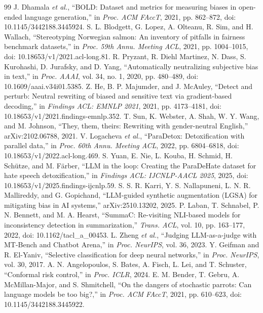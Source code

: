 \documentclass[12pt,a4paper,oneside]{report}
\begin{document}
\begin{thebibliography}{99}
 J. Dhamala \textit{et al.}, ``BOLD: Dataset and metrics for measuring biases in open-ended language generation,'' in \textit{Proc. ACM FAccT}, 2021, pp. 862--872, doi: 10.1145/3442188.3445924.
 S. L. Blodgett, G. Lopez, A. Olteanu, R. Sim, and H. Wallach, ``Stereotyping Norwegian salmon: An inventory of pitfalls in fairness benchmark datasets,'' in \textit{Proc. 59th Annu. Meeting ACL}, 2021, pp. 1004--1015, doi: 10.18653/v1/2021.acl-long.81.
 R. Pryzant, R. Diehl Martinez, N. Dass, S. Kurohashi, D. Jurafsky, and D. Yang, ``Automatically neutralizing subjective bias in text,'' in \textit{Proc. AAAI}, vol. 34, no. 1, 2020, pp. 480--489, doi: 10.1609/aaai.v34i01.5385.
 Z. He, B. P. Majumder, and J. McAuley, ``Detect and perturb: Neutral rewriting of biased and sensitive text via gradient-based decoding,'' in \textit{Findings ACL: EMNLP 2021}, 2021, pp. 4173--4181, doi: 10.18653/v1/2021.findings-emnlp.352.
 T. Sun, K. Webster, A. Shah, W. Y. Wang, and M. Johnson, ``They, them, theirs: Rewriting with gender-neutral English,'' arXiv:2102.06788, 2021.
 V. Logacheva \textit{et al.}, ``ParaDetox: Detoxification with parallel data,'' in \textit{Proc. 60th Annu. Meeting ACL}, 2022, pp. 6804--6818, doi: 10.18653/v1/2022.acl-long.469.
 S. Yuan, E. Nie, L. Kouba, H. Schmid, H. Sch\"utze, and M. F\"arber, ``LLM in the loop: Creating the ParaDeHate dataset for hate speech detoxification,'' in \textit{Findings ACL: IJCNLP-AACL 2025}, 2025, doi: 10.18653/v1/2025.findings-ijcnlp.59.
 S. S. R. Karri, Y. S. Nallapuneni, L. N. R. Mallireddy, and G. Gopichand, ``LLM-guided synthetic augmentation (LGSA) for mitigating bias in AI systems,'' arXiv:2510.13202, 2025.
 P. Laban, T. Schnabel, P. N. Bennett, and M. A. Hearst, ``SummaC: Re-visiting NLI-based models for inconsistency detection in summarization,'' \textit{Trans. ACL}, vol. 10, pp. 163--177, 2022, doi: 10.1162/tacl\_a\_00453.
 L. Zheng \textit{et al.}, ``Judging LLM-as-a-judge with MT-Bench and Chatbot Arena,'' in \textit{Proc. NeurIPS}, vol. 36, 2023.
 Y. Geifman and R. El-Yaniv, ``Selective classification for deep neural networks,'' in \textit{Proc. NeurIPS}, vol. 30, 2017.
 A. N. Angelopoulos, S. Bates, A. Fisch, L. Lei, and T. Schuster, ``Conformal risk control,'' in \textit{Proc. ICLR}, 2024.
 E. M. Bender, T. Gebru, A. McMillan-Major, and S. Shmitchell, ``On the dangers of stochastic parrots: Can language models be too big?,'' in \textit{Proc. ACM FAccT}, 2021, pp. 610--623, doi: 10.1145/3442188.3445922.

\end{thebibliography}
\end{document}

